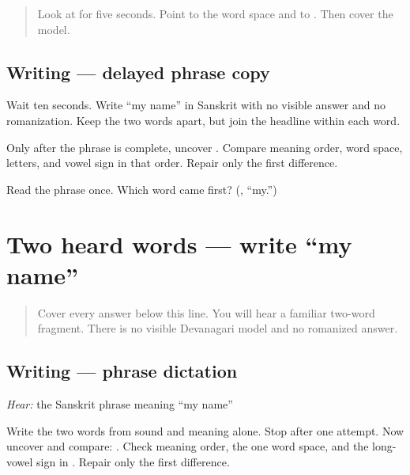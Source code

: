 \begin{quote}
Look at \textbf{ } for five seconds. Point to the word space and to \textbf{}. Then cover the model.
\end{quote}

\subsection*{Writing — delayed phrase copy}

Wait ten seconds. Write “my name” in Sanskrit with no visible answer and no romanization. Keep the two words apart, but join the headline within each word.

Only after the phrase is complete, uncover \textbf{ }. Compare meaning order, word space, letters, and vowel sign in that order. Repair only the first difference.

\begin{tcolorbox}[breakable,colback=teal!4,colframe=teal!35!black,title={Before you move on}]
Read the phrase once. Which word came first? (\textbf{}, “my.”)
\end{tcolorbox}
\section[\texorpdfstring{\sk{मम} \sk{नाम} (mama nāma)}{मम नाम (mama nāma)}]{Two heard words — write “my name”}

\label{lesson:SA-W03-mama-nama-dictation}



\begin{quote}
Cover every answer below this line. You will hear a familiar two-word fragment. There is no visible Devanagari model and no romanized answer.
\end{quote}

\subsection*{Writing — phrase dictation}
\emph{Hear:} the Sanskrit phrase meaning “my name”

Write the two words from sound and meaning alone. Stop after one attempt. Now uncover and compare: \textbf{ }. Check meaning order, the one word space, and the long-vowel sign in \textbf{}. Repair only the first difference.

